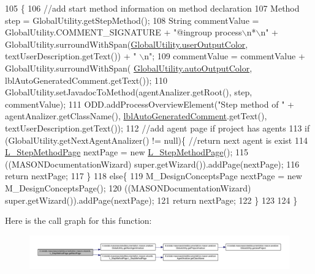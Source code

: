 \begin{DoxyCode}
105                                     \{ 
106         \textcolor{comment}{//add start method information on method declaration}
107         Method step = GlobalUtility.getStepMethod();
108         String commentValue = GlobalUtility.COMMENT\_SIGNATURE + \textcolor{stringliteral}{"@ingroup process\(\backslash\)n*\(\backslash\)n"} + 
      GlobalUtility.surroundWithSpan(\hyperlink{classit_1_1isislab_1_1masonassisteddocumentation_1_1mason_1_1analizer_1_1_global_utility_a0fcb324ae33eb93bd5b9177e342ecc82}{GlobalUtility.userOutputColor}, textUserDescription.getText()) + \textcolor{stringliteral}{"
      \(\backslash\)n"};
109         commentValue = commentValue + GlobalUtility.surroundWithSpan(
      \hyperlink{classit_1_1isislab_1_1masonassisteddocumentation_1_1mason_1_1analizer_1_1_global_utility_a2e086c8a2d8edf16b2eaf90408832adc}{GlobalUtility.autoOutputColor}, lblAutoGeneratedComment.getText());
110         GlobalUtility.setJavadocToMethod(agentAnalizer.getRoot(), step, commentValue);
111         ODD.addProcessOverviewElement(\textcolor{stringliteral}{"Step method of "} + agentAnalizer.getClassName(), 
      \hyperlink{classit_1_1isislab_1_1masonassisteddocumentation_1_1mason_1_1wizards_1_1_l___step_method_page_ae387c5a1c2bc2000a32d76fa15d5002f}{lblAutoGeneratedComment}.getText(), textUserDescription.getText());
112         \textcolor{comment}{//add agent page if project has agents}
113         \textcolor{keywordflow}{if} (GlobalUtility.getNextAgentAnalizer() != null)\{  \textcolor{comment}{//return next agent is exist}
114             \hyperlink{classit_1_1isislab_1_1masonassisteddocumentation_1_1mason_1_1wizards_1_1_l___step_method_page_a177f2d92f21a604cf845592cb5158919}{L\_StepMethodPage} nextPage = \textcolor{keyword}{new} \hyperlink{classit_1_1isislab_1_1masonassisteddocumentation_1_1mason_1_1wizards_1_1_l___step_method_page_a177f2d92f21a604cf845592cb5158919}{L\_StepMethodPage}();
115             ((MASONDocumentationWizard) super.getWizard()).addPage(nextPage);
116             \textcolor{keywordflow}{return} nextPage;
117         \}
118         \textcolor{keywordflow}{else}\{
119             M\_DesignConceptsPage nextPage = \textcolor{keyword}{new} M\_DesignConceptsPage();
120             ((MASONDocumentationWizard) super.getWizard()).addPage(nextPage);
121             \textcolor{keywordflow}{return} nextPage;
122         \}
123         
124     \}
\end{DoxyCode}


Here is the call graph for this function\-:\nopagebreak
\begin{figure}[H]
\begin{center}
\leavevmode
\includegraphics[width=350pt]{classit_1_1isislab_1_1masonassisteddocumentation_1_1mason_1_1wizards_1_1_l___step_method_page_ac7b8048dd2841c779f601c26669af578_cgraph}
\end{center}
\end{figure}


